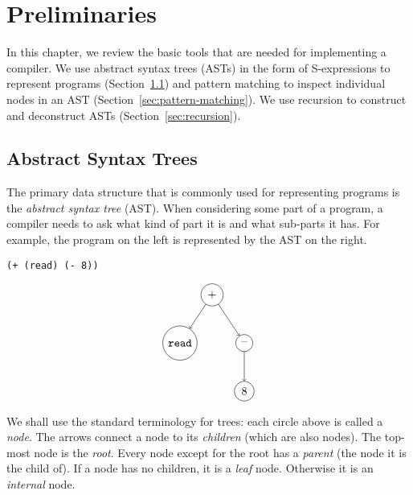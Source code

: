 \documentclass[12pt]{book}
\begin{document}

\chapter{Preliminaries}
\label{ch:trees-recur}

In this chapter, we review the basic tools that are needed for
implementing a compiler. We use abstract syntax trees (ASTs) in the
form of S-expressions to represent programs (Section~\ref{sec:ast})
and pattern matching to inspect individual nodes in an AST
(Section~\ref{sec:pattern-matching}).  We use recursion to construct
and deconstruct ASTs (Section~\ref{sec:recursion}).

\section{Abstract Syntax Trees}
\label{sec:ast}

The primary data structure that is commonly used for representing
programs is the \emph{abstract syntax tree} (AST). When considering
some part of a program, a compiler needs to ask what kind of part it
is and what sub-parts it has. For example, the program on the left is
represented by the AST on the right.
\begin{center}
\begin{minipage}{0.4\textwidth}
\begin{lstlisting}
(+ (read) (- 8))
\end{lstlisting}
\end{minipage}
\begin{minipage}{0.4\textwidth}
\begin{equation}
\begin{tikzpicture}[baseline=(current  bounding  box.center)]
 \node[draw, circle] (plus)  at (0 ,  0) {$+$};
 \node[draw, circle] (read)  at (-1, -1.5) {$\tt read$};
 \node[draw, circle] (minus) at (1 , -1.5) {$\text{--}$};
 \node[draw, circle] (8)     at (1 , -3) {$8$};

 \draw[->] (plus) to (read);
 \draw[->] (plus) to (minus);
 \draw[->] (minus) to (8);
\end{tikzpicture}
\label{eq:arith-prog}
\end{equation}
\end{minipage}
\end{center}
We shall use the standard terminology for trees: each circle above is
called a \emph{node}. The arrows connect a node to its \emph{children}
(which are also nodes). The top-most node is the \emph{root}.  Every
node except for the root has a \emph{parent} (the node it is the child
of). If a node has no children, it is a \emph{leaf} node.  Otherwise
it is an \emph{internal} node.
\end{document}
